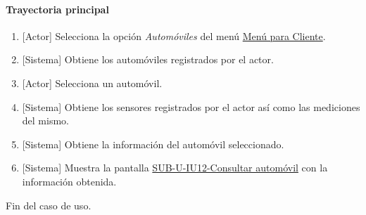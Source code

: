 \paragraph{Trayectoria principal}
	\begin{enumerate}
		\item {[Actor]} Selecciona la opción \textit{Automóviles} del menú \hyperref[fig:menu-cliente]{Menú para Cliente}.
		\item {[Sistema]} Obtiene los automóviles registrados por el actor.
		\item {[Actor]} Selecciona un automóvil.
		\item {[Sistema]} Obtiene los sensores registrados por el actor así como las mediciones del mismo.
		\item {[Sistema]} Obtiene la información del automóvil seleccionado.
		\item {[Sistema]} Muestra la pantalla \hyperref[fig:sub-u-iu12]{SUB-U-IU12-Consultar automóvil} con la información obtenida.
	\end{enumerate}
	Fin del caso de uso.

